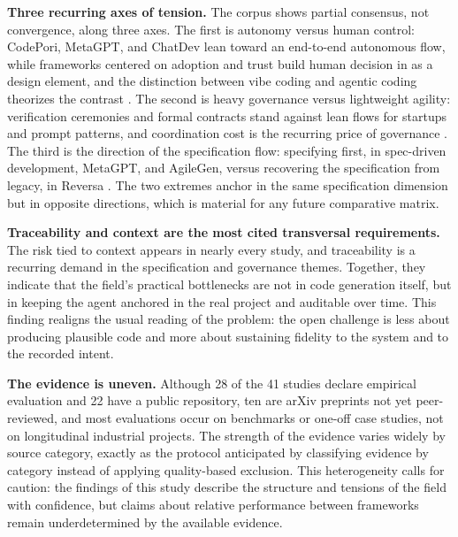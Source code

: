 \noindent\textbf{Three recurring axes of tension.} The corpus shows partial consensus, not convergence, along three axes. The first is autonomy versus human control: CodePori, MetaGPT, and ChatDev lean toward an end-to-end autonomous flow, while frameworks centered on adoption and trust build human decision in as a design element, and the distinction between vibe coding and agentic coding theorizes the contrast \cite{ZeeshanRasheed2024,SiruiHong2023,ChenQian2023,SaiZhang2025,DanielRusso2024,Baron2025,RanjanSapkota2025}. The second is heavy governance versus lightweight agility: verification ceremonies and formal contracts stand against lean flows for startups and prompt patterns, and coordination cost is the recurring price of governance \cite{Merchant2025,Paduraru2026,Khan2026,JulesWhite2023}. The third is the direction of the specification flow: specifying first, in spec-driven development, MetaGPT, and AgileGen, versus recovering the specification from legacy, in Reversa \cite{DeepakBabuPiskala2026,SiruiHong2023,SaiZhang2025,Macedo2026}. The two extremes anchor in the same specification dimension but in opposite directions, which is material for any future comparative matrix.

\noindent\textbf{Traceability and context are the most cited transversal requirements.} The risk tied to context appears in nearly every study, and traceability is a recurring demand in the specification and governance themes. Together, they indicate that the field's practical bottlenecks are not in code generation itself, but in keeping the agent anchored in the real project and auditable over time. This finding realigns the usual reading of the problem: the open challenge is less about producing plausible code and more about sustaining fidelity to the system and to the recorded intent.

\noindent\textbf{The evidence is uneven.} Although 28 of the 41 studies declare empirical evaluation and 22 have a public repository, ten are arXiv preprints not yet peer-reviewed, and most evaluations occur on benchmarks or one-off case studies, not on longitudinal industrial projects. The strength of the evidence varies widely by source category, exactly as the protocol anticipated by classifying evidence by category instead of applying quality-based exclusion. This heterogeneity calls for caution: the findings of this study describe the structure and tensions of the field with confidence, but claims about relative performance between frameworks remain underdetermined by the available evidence.
